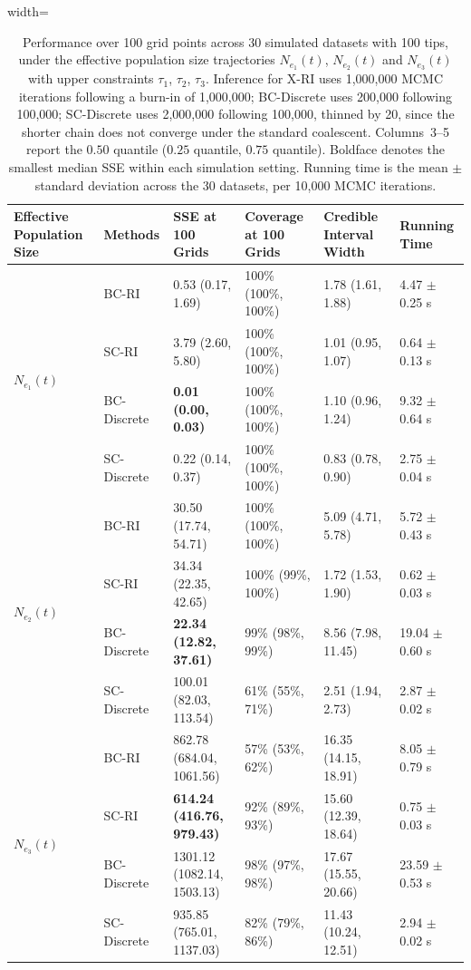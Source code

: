 \begin{table}[H]
\centering
\begin{adjustbox}{width=\textwidth}
\begin{tabular}{p{3.0cm} p{3.0cm} p{4.6cm} p{4.0cm} p{3.8cm} p{2.8cm}}
\toprule[1.5pt]
\textbf{Effective Population Size} & \textbf{Methods} & \textbf{SSE at 100 Grids}
& \textbf{Coverage at 100 Grids} & \textbf{Credible Interval Width} & \textbf{Running Time} \\
\midrule
\multirow{4}{*}{$N_{e_1}(t)$}
& BC-RI & 0.53 (0.17, 1.69) & 100\% (100\%, 100\%) & 1.78 (1.61, 1.88) & 4.47 $\pm$ 0.25 s \\
& SC-RI & 3.79 (2.60, 5.80) & 100\% (100\%, 100\%) & 1.01 (0.95, 1.07) & 0.64 $\pm$ 0.13 s \\
& BC-Discrete & \textbf{0.01 (0.00, 0.03)} & 100\% (100\%, 100\%) & 1.10 (0.96, 1.24) & 9.32 $\pm$ 0.64 s \\
& SC-Discrete & 0.22 (0.14, 0.37) & 100\% (100\%, 100\%) & 0.83 (0.78, 0.90) & 2.75 $\pm$ 0.04 s \\
\midrule
\multirow{4}{*}{$N_{e_2}(t)$}
& BC-RI & 30.50 (17.74, 54.71) & 100\% (100\%, 100\%) & 5.09 (4.71, 5.78) & 5.72 $\pm$ 0.43 s \\
& SC-RI & 34.34 (22.35, 42.65) & 100\% (99\%, 100\%) & 1.72 (1.53, 1.90) & 0.62 $\pm$ 0.03 s \\
& BC-Discrete & \textbf{22.34 (12.82, 37.61)} & 99\% (98\%, 99\%) & 8.56 (7.98, 11.45) & 19.04 $\pm$ 0.60 s \\
& SC-Discrete & 100.01 (82.03, 113.54) & 61\% (55\%, 71\%) & 2.51 (1.94, 2.73) & 2.87 $\pm$ 0.02 s \\
\midrule
\multirow{4}{*}{$N_{e_3}(t)$}
& BC-RI & 862.78 (684.04, 1061.56) & 57\% (53\%, 62\%) & 16.35 (14.15, 18.91) & 8.05 $\pm$ 0.79 s \\
& SC-RI & \textbf{614.24 (416.76, 979.43)} & 92\% (89\%, 93\%) & 15.60 (12.39, 18.64) & 0.75 $\pm$ 0.03 s \\
& BC-Discrete & 1301.12 (1082.14, 1503.13) & 98\% (97\%, 98\%) & 17.67 (15.55, 20.66) & 23.59 $\pm$ 0.53 s \\
& SC-Discrete & 935.85 (765.01, 1137.03) & 82\% (79\%, 86\%) & 11.43 (10.24, 12.51) & 2.94 $\pm$ 0.02 s \\

\bottomrule[1.5pt]
\end{tabular}
\end{adjustbox}
\captionsetup{font=footnotesize}
\caption{Performance over 100 grid points across 30 simulated datasets with 100
tips, under the effective population size trajectories $N_{e_1}(t)$, $N_{e_2}(t)$
and $N_{e_3}(t)$ with upper constraints $\tau_1$, $\tau_2$, $\tau_3$. Inference
for X-RI uses 1{,}000{,}000 MCMC iterations following a burn-in of 1{,}000{,}000;
BC-Discrete uses 200{,}000 following 100{,}000; SC-Discrete uses 2{,}000{,}000
following 100{,}000, thinned by 20, since the shorter chain does not converge
under the standard coalescent. Columns~3--5 report the $0.50$ quantile ($0.25$
quantile, $0.75$ quantile). Boldface denotes the smallest median SSE within each
simulation setting. Running time is the mean $\pm$ standard deviation across the
30 datasets, per 10{,}000 MCMC iterations.}
\label{table:rerun100}
\end{table}
